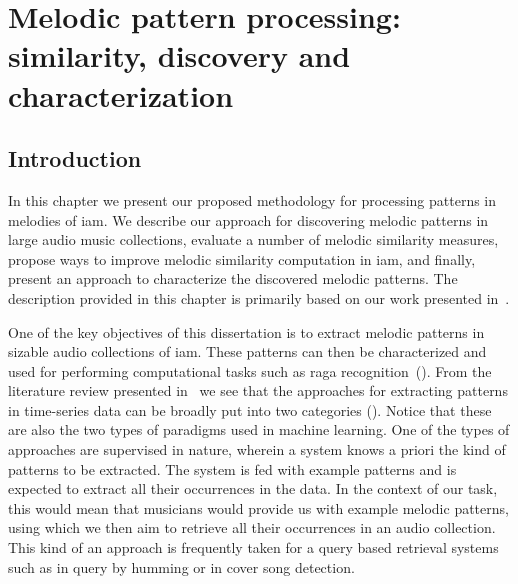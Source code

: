 
\chapter{Melodic pattern processing: similarity, discovery and characterization}
\label{chap:melodic_pattern_processing}

\section{Introduction}
\label{sec:patterns_introduction}

In this chapter we present our proposed methodology for processing patterns in melodies of \gls{iam}. We describe our approach for discovering melodic patterns in large audio music collections, evaluate a number of melodic similarity measures, propose ways to improve melodic similarity computation in \gls{iam}, and finally, present an approach to characterize the discovered melodic patterns. The description provided in this chapter is primarily based on our work presented in~\cite{gulati_SITIS_2014,gulati_ICASSP2015, gulati_ISMIR_2015,gulati_communities_2016}. %


One of the key objectives of this dissertation is to extract melodic patterns in sizable audio collections of \gls{iam}. These patterns can then be characterized and used for performing computational tasks such as \gls{raga} recognition~(). From the literature review presented in~ we see that the approaches for extracting patterns in time-series data can be broadly put into two categories (). Notice that these are also the two types of paradigms used in machine learning. One of the types of approaches are supervised in nature, wherein a system knows a priori the kind of patterns to be extracted. The system is fed with example patterns and is expected to extract all their occurrences in the data. In the context of our task, this would mean that musicians would provide us with example melodic patterns, using which we then aim to retrieve all their occurrences in an audio collection. This kind of an approach is frequently taken for a query based retrieval systems such as in query by humming or in cover song detection. 


